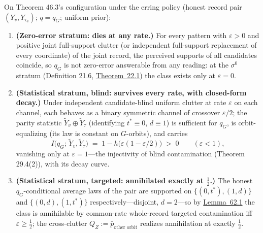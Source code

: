 \begin{thmplain}

On Theorem 46.3's configuration under the erring policy (honest record pair \((Y_v, Y_{\tau_a})\); \(q = q_G\); uniform prior):

\begin{enumerate}
\def\labelenumi{\arabic{enumi}.}
\item
  \textbf{(Zero-error stratum: dies at any rate.)} For every pattern with \(\varepsilon > 0\) and positive joint full-support clutter (or independent full-support replacement of every coordinate) of the joint record, the perceived supports of all candidates coincide, so \(q_G\) is not zero-error answerable from any reading: at the \(\sigma^0\) stratum (Definition 21.6, \hyperlink{stmt:22.1}{Theorem~22.1}) the class exists only at \(\varepsilon = 0\).
\item
  \textbf{(Statistical stratum, blind: survives every rate, with closed-form decay.)} Under independent candidate-blind uniform clutter at rate \(\varepsilon\) on each channel, each behaves as a binary symmetric channel of crossover \(\varepsilon/2\); the parity statistic \(\widetilde{Y}_v \oplus \widetilde{Y}_\tau\) (identifying \(t^* \equiv 0\), \(d \equiv 1\)) is sufficient for \(q_G\), is orbit-equalizing (its law is constant on \(G\)-orbits), and carries
  \[
  I\big(q_G;\, \widetilde{Y}_v, \widetilde{Y}_\tau\big) \;=\; 1 - h\big(\varepsilon(1 - \varepsilon/2)\big) \;>\; 0
  \qquad (\varepsilon < 1),
  \]
  vanishing only at \(\varepsilon = 1\)---\hspace{0pt}the injectivity of blind contamination (Theorem 29.4(2)), with its decay curve.
\item
  \textbf{(Statistical stratum, targeted: annihilated exactly at \(\tfrac12\).)} The honest \(q_G\)-conditional average laws of the pair are supported on \(\{(0,t^*),(1,d)\}\) and \(\{(0,d),(1,t^*)\}\) respectively---\hspace{0pt}disjoint, \(d = 2\)---\hspace{0pt}so by \hyperlink{stmt:62.1}{Lemma~62.1} the class is annihilable by common-rate whole-record targeted contamination iff \(\varepsilon \ge \tfrac12\); the cross-clutter \(Q_Z := \bar p_{\text{other orbit}}\) realizes annihilation at exactly \(\tfrac12\).
\end{enumerate}
\end{thmplain}


